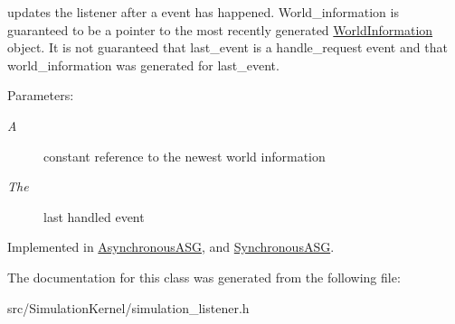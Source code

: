 updates the listener after a event has happened. World\_\-information is guaranteed to be a pointer to the most recently generated \hyperlink{class_world_information}{WorldInformation} object. It is not guaranteed that last\_\-event is a handle\_\-request event and that world\_\-information was generated for last\_\-event.

\begin{Desc}
\item[Parameters:]
\begin{description}
\item[{\em A}]constant reference to the newest world information \item[{\em The}]last handled event \end{description}
\end{Desc}


Implemented in \hyperlink{class_asynchronous_a_s_g_159110685ece0b48788dcf9d2c085010}{AsynchronousASG}, and \hyperlink{class_synchronous_a_s_g_4b85489783f05e0061c701a1dac51773}{SynchronousASG}.

The documentation for this class was generated from the following file:\begin{CompactItemize}
\item 
src/SimulationKernel/simulation\_\-listener.h\end{CompactItemize}
